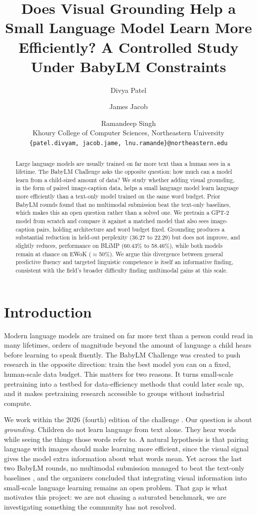 \documentclass[11pt]{article}
\title{Does Visual Grounding Help a Small Language Model Learn More Efficiently? A Controlled Study Under BabyLM Constraints}
\author{
  Divya Patel \and James Jacob \and Ramandeep Singh \\
  Khoury College of Computer Sciences, Northeastern University \\
  \texttt{\{patel.divyam, jacob.jame, lnu.ramande\}@northeastern.edu}
}
\begin{document}
\maketitle

\begin{abstract}
Large language models are usually trained on far more text than a human sees in a lifetime. The BabyLM Challenge asks the opposite question: how much can a model learn from a child-sized amount of data? We study whether adding visual grounding, in the form of paired image-caption data, helps a small language model learn language more efficiently than a text-only model trained on the same word budget. Prior BabyLM rounds found that no multimodal submission beat the text-only baselines, which makes this an open question rather than a solved one. We pretrain a GPT-2 model from scratch and compare it against a matched model that also sees image-caption pairs, holding architecture and word budget fixed. Grounding produces a substantial reduction in held-out perplexity (36.27 to 22.29) but does not improve, and slightly reduces, performance on BLiMP (60.43\% to 58.46\%), while both models remain at chance on EWoK ($\approx$50\%). We argue this divergence between general predictive fluency and targeted linguistic competence is itself an informative finding, consistent with the field's broader difficulty finding multimodal gains at this scale.
\end{abstract}

\section{Introduction}
Modern language models are trained on far more text than a person could read in many lifetimes, orders of magnitude beyond the amount of language a child hears before learning to speak fluently. The BabyLM Challenge \citep{warstadt2023findings, choshen2024findings} was created to push research in the opposite direction: train the best model you can on a fixed, human-scale data budget. This matters for two reasons. It turns small-scale pretraining into a testbed for data-efficiency methods that could later scale up, and it makes pretraining research accessible to groups without industrial compute.

We work within the 2026 (fourth) edition of the challenge \citep{babylm2026cfp}. Our question is about \emph{grounding}. Children do not learn language from text alone. They hear words while seeing the things those words refer to. A natural hypothesis is that pairing language with images should make learning more efficient, since the visual signal gives the model extra information about what words mean. Yet across the last two BabyLM rounds, no multimodal submission managed to beat the text-only baselines \citep{choshen2024findings}, and the organizers concluded that integrating visual information into small-scale language learning remains an open problem. That gap is what motivates this project: we are not chasing a saturated benchmark, we are investigating something the community has not resolved.
\end{document}
